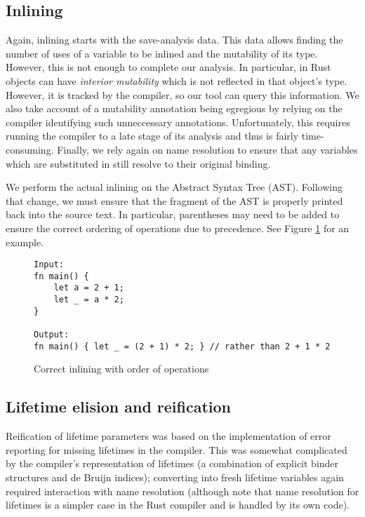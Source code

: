 \subsection{Inlining}

Again, inlining starts with the save-analysis data. This data allows finding the number of uses of a variable to be inlined and the mutability of its type. However, this is not enough to complete our analysis. In particular, in Rust objects can have \textit{interior mutability} which is not reflected in that object's type. However, it is tracked by the compiler, so our tool can query this information. We also take account of a mutability annotation being egregious by relying on the compiler identifying such unneccessary annotations. Unfortunately, this requires running the compiler to a late stage of its analysis and thus is fairly time-consuming. Finally, we rely again on name resolution to ensure that any variables which are substituted in still resolve to their original binding.

We perform the actual inlining on the Abstract Syntax Tree (AST). Following that change, we must ensure that the fragment of the AST is properly printed back into the source text. In particular, parentheses may need to be added to ensure the correct ordering of operations due to precedence. See Figure \ref{Fig:exinline} for an example.\\

\begin{figure}[h]
\centering
\begin{verbatim}
Input:
fn main() {
    let a = 2 + 1;
    let _ = a * 2;
}

Output:
fn main() { let _ = (2 + 1) * 2; } // rather than 2 + 1 * 2
\end{verbatim}
\caption{Correct inlining with order of operations}
\label{Fig:exinline}
\end{figure}

\subsection{Lifetime elision and reification}

Reification of lifetime parameters was based on the implementation of error reporting for missing lifetimes in the compiler. This was somewhat complicated by the compiler's representation of lifetimes (a combination of explicit binder structures and de Bruijn indices); converting into fresh lifetime variables again required interaction with name resolution (although note that name resolution for lifetimes is a simpler case in the Rust compiler and is handled by its own code).

